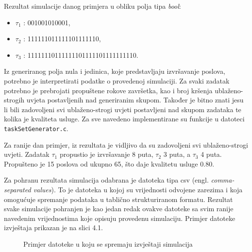 \documentclass[../zavrsni.tex]{subfiles}
\begin{document}
Rezultat simulacije danog primjera u obliku polja tipa \textit{bool}:

\begin{itemize}
        \item[] $\tau_1$ : 001001010001,
        \item[] $\tau_2$ : 111111011111101111110,
        \item[] $\tau_3$ : 11111110111111101111101111111110.
\end{itemize}

Iz generiranog polja nula i jedinica, koje predstavljaju izvršavanje poslova, potrebno je interpretirati podatke o provedenoj simulaciji.
Za svaki zadatak potrebno je prebrojati propuštene rokove završetka, kao i broj kršenja ublaženo-strogih uvjeta postavljenih nad generiranim skupom.
Također je bitno znati jesu li bili zadovoljeni svi ublaženo-strogi uvjeti 
postavljeni nad skupom zadataka te kolika je kvaliteta usluge. Za sve navedeno implementirane su funkcije u datoteci \texttt{taskSetGenerator.c}.

Za ranije dan primjer, iz rezultata je vidljivo da su zadovoljeni svi ublaženo-strogi uvjeti. Zadatak $\tau_1$ 
propustio je izvršavanje 8 puta, $\tau_2$ 3 puta, a $\tau_3$ 4 puta. Propušteno je 15 poslova od ukupno 65, što
daje kvalitetu usluge 0.80. 

Za pohranu rezultata simulacija odabrana je datoteka tipa csv (engl. \textit{comma-separated values}). To je datoteka u kojoj su vrijednosti odvojene zarezima 
i koja omogućuje spremanje podataka u tablično strukturiranom formatu. Rezultat svake simulacije pohranjen je kao jedan redak ovakve datoteke sa svim ranije 
navedenim vrijednostima koje opisuju provedenu simulaciju. Primjer datoteke izvještaja prikazan je na slici 4.1.

\begin{figure}[!htb]
    \caption{\label{fig:my-label} Primjer datoteke u koju se spremaju izvještaji simulacija}
  \end{figure}
\end{document}
